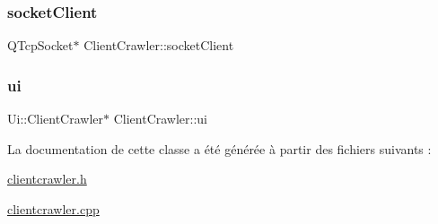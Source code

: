 \subsubsection{\texorpdfstring{socket\+Client}{socketClient}}
{\footnotesize\ttfamily Q\+Tcp\+Socket$\ast$ Client\+Crawler\+::socket\+Client\hspace{0.3cm}{\ttfamily [private]}}

\mbox{\label{class_client_crawler_a6263947f12b0ca34753f4cbb43d6d4fd}} 
\subsubsection{\texorpdfstring{ui}{ui}}
{\footnotesize\ttfamily Ui\+::\+Client\+Crawler$\ast$ Client\+Crawler\+::ui\hspace{0.3cm}{\ttfamily [private]}}



La documentation de cette classe a été générée à partir des fichiers suivants \+:\begin{DoxyCompactItemize}
\item 
\hyperlink{clientcrawler_8h}{clientcrawler.\+h}\item 
\hyperlink{clientcrawler_8cpp}{clientcrawler.\+cpp}\end{DoxyCompactItemize}
